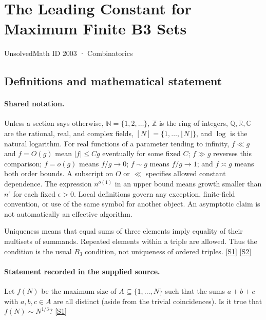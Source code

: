 \documentclass[11pt,a4paper]{article}
\newcommand{\N}{\mathbb{N}}
\newcommand{\Z}{\mathbb{Z}}
\newcommand{\Q}{\mathbb{Q}}
\newcommand{\R}{\mathbb{R}}
\newcommand{\C}{\mathbb{C}}
\newcommand{\sref}[2]{\hyperlink{source:#1:#2}{[S#2]}}
\begin{document}

\setcounter{section}{2002}

\section{The Leading Constant for Maximum Finite B3 Sets}\label{2003}

{\small\sffamily UnsolvedMath ID 2003 · Combinatorics}

\subsection{Definitions and mathematical statement}

\paragraph{Shared notation.}Unless a section says otherwise, $\N=\{1,2,\ldots\}$,
$\Z$ is the ring of integers, $\Q,\R,\C$ are the rational, real, and complex
fields, $[N]=\{1,\ldots,\lfloor N\rfloor\}$, and $\log$ is the natural
logarithm. For real functions of a parameter tending to infinity,
$f\ll g$ and $f=O(g)$ mean $|f|\leq Cg$ eventually for some fixed $C$;
$f\gg g$ reverses this comparison; $f=o(g)$ means $f/g\to0$;
$f\sim g$ means $f/g\to1$; and $f\asymp g$ means both order bounds.
A subscript on $O$ or $\ll$ specifies allowed constant dependence.
The expression $n^{o(1)}$ in an upper bound means growth smaller than
$n^\epsilon$ for each fixed $\epsilon>0$. Local definitions govern any
exception, finite-field convention, or use of the same symbol for another
object. An asymptotic claim is not automatically an effective algorithm.



Uniqueness means that equal sums of three elements imply equality of their multisets of summands. Repeated elements within a triple are allowed. Thus the condition is the usual $B_3$ condition, not uniqueness of ordered triples. \sref{2003}{1} \sref{2003}{2}

\paragraph{Statement recorded in the supplied source.}
Let $f(N)$ be the maximum size of $A\subseteq \{1,\ldots,N\}$ such that the sums $a+b+c$ with $a,b,c\in A$ are all distinct (aside from the trivial coincidences). Is it true that $  f(N)\sim N^{1/3}? $ \sref{2003}{1}
\end{document}
